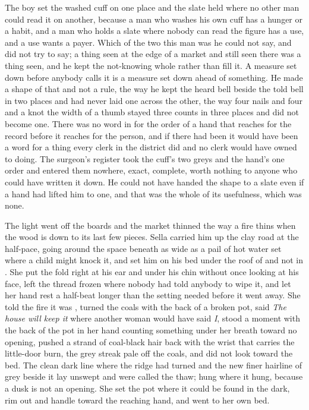 The boy set the washed cuff on one place and the slate held where no other man could read it on another, because a man who washes his own cuff has a hunger or a habit, and a man who holds a slate where nobody can read the figure has a use, and a use wants a payer. Which of the two this man was he could not say, and did not try to say; a thing seen at the edge of a market and still seen there was a thing seen, and he kept the not-knowing whole rather than fill it. A measure set down before anybody calls it is a measure set down ahead of something. He made a shape of that and not a rule, the way he kept the heard bell beside the told bell in two places and had never laid one across the other, the way four nails and four and a knot the width of a thumb stayed three counts in three places and did not become one. There was no word in  for the order of a hand that reaches for the record before it reaches for the person, and if there had been it would have been a word for a thing every clerk in the district did and no clerk would have owned to doing. The surgeon's register took the cuff's two greys and the hand's one order and entered them nowhere, exact, complete, worth nothing to anyone who could have written it down. He could not have handed the shape to a slate even if a hand had lifted him to one, and that was the whole of its usefulness, which was none.

\scenebreak

The light went off the boards and the market thinned the way a fire thins when the wood is down to its last few pieces. Sella carried him up the clay road at the half-pace, going around the space beneath  as wide as a pail of hot water set where a child might knock it, and set him on his bed under the roof of  and not in . She put the fold right at his ear and under his chin without once looking at his face, left the thread frozen where nobody had told anybody to wipe it, and let her hand rest a half-beat longer than the setting needed before it went away. She told the fire it was , turned the coals with the back of a broken pot, said \emph{The house will keep it} where another woman would have said \emph{I}, stood a moment with the back of the pot in her hand counting something under her breath toward no opening, pushed a strand of coal-black hair back with the wrist that carries the little-door burn, the grey streak pale off the coals, and did not look toward the bed. The clean dark line where the  ridge had turned and the new finer hairline of grey beside it lay unswept and were called the thaw;  hung where it hung, because a dusk is not an opening. She set the pot where it could be found in the dark, rim out and handle toward the reaching hand, and went to her own bed.

